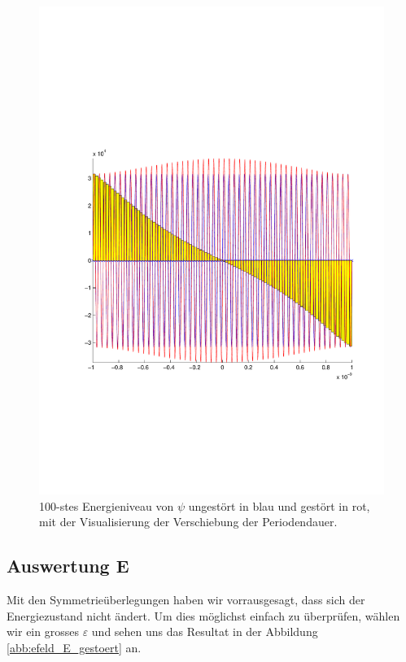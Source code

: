 \begin{refsection}
\begin{figure}
 \centering
 \includegraphics[width=12cm,clip=true,trim=2cm 7cm 1cm 8cm]{efeld/Psi_100_gestoert.pdf}
 \caption{100-stes Energieniveau von $\psi$ ungest\"ort in blau und gest\"ort in rot, mit der Visualisierung der Verschiebung der Periodendauer.}
 \label{abb:efeld_psi_100_gestoert}
\end{figure}




\subsection{Auswertung E}

Mit den Symmetrie\"uberlegungen haben wir vorrausgesagt, dass sich der Energiezustand nicht \"andert.
Um dies m\"oglichst einfach zu \"uberpr\"ufen, w\"ahlen wir ein grosses $\varepsilon$ und sehen uns das Resultat in der 
Abbildung \ref{abb:efeld_E_gestoert} an.


\end{refsection}
